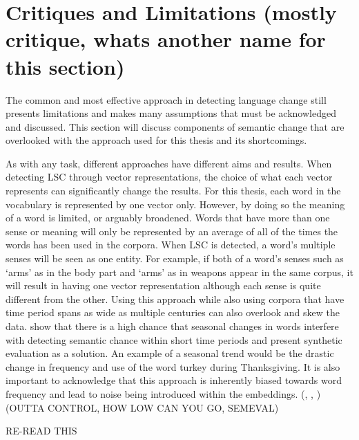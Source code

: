 \section{Critiques and Limitations (mostly critique, whats another name for this section)}
\label{sec:critiques}

The common and most effective approach in detecting language change still presents limitations and makes many assumptions that must be acknowledged and discussed. This section will discuss components of semantic change that are overlooked with the approach used for this thesis and its shortcomings. 

As with any task, different approaches have different aims and results. When detecting LSC through vector representations, the choice of what each vector represents can significantly change the results. For this thesis, each word in the vocabulary is represented by one vector only. However, by doing so the meaning of a word is limited, or arguably broadened. Words that have more than one sense or meaning will only be represented by an average of all of the times the words has been used in the corpora. When LSC is detected, a word’s multiple senses will be seen as one entity. For example, if both of a word’s senses such as ‘arms’ as in the body part and ‘arms’ as in weapons appear in the same corpus, it will result in having one vector representation although each sense is quite different from the other. Using this approach while also using corpora that have time period spans as wide as multiple centuries can also overlook and skew the data. \citet{shoemark-etal-2019-room} show that there is a high chance that seasonal changes in words interfere with detecting semantic chance within short time periods and present synthetic evaluation as a solution. An example of a seasonal trend would be the drastic change in frequency and use of the word turkey during Thanksgiving. It is also important to acknowledge that this approach is inherently biased towards word frequency and lead to noise being introduced within the embeddings. (\citet{dubossarsky-etal-2017-outta}, \citet{kaiser-etal-2020-ims}, \citet{schlechtweg-etal-2020-semeval}) (OUTTA CONTROL, HOW LOW CAN YOU GO, SEMEVAL)


RE-READ THIS

